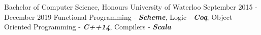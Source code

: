 \begin{cventries}
  \cventry
    {Bachelor of Computer Science, Honours }
    {University of Waterloo}
    {September 2015 - December 2019}
    {}
    {Functional Programming - \textbf{\textit{Scheme}}, Logic - \textbf{\textit{Coq}}, Object Oriented Programming - \textbf{\textit{C++14}}, Compilers - \textbf{\textit{Scala}}}
\end{cventries}
